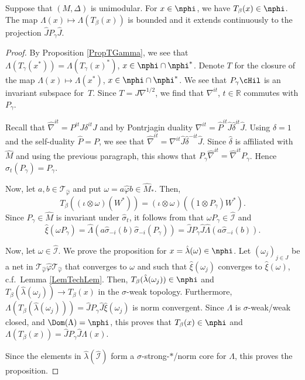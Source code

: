\begin{prop}\label{PropTBeta}
Suppose that $(M, \Delta)$ is unimodular. For $x \in \nphi$, we have $T_\beta(x) \in \nphi$. The map $\Lambda(x) \mapsto \Lambda(T_\beta(x))$ is bounded and it extends continuously to the projection $\hat{J} P_\gamma \hat{J}$.
\end{prop}
\begin{proof}
By Proposition \ref{PropTGamma}, we see that $\Lambda(T_\gamma(x^\ast)) = \Lambda(T_\gamma(x)^\ast)$, $x \in \nphi \cap \nphi^\ast$. Denote $T$ for the closure of the map $\Lambda(x) \mapsto \Lambda(x^\ast)$, $x \in \nphi \cap \nphi^\ast$. We see that $P_\gamma \cHil$ is an invariant subspace for~$T$. Since $T = J \nabla^{1/2}$, we f\/ind that $\nabla^{it}$, $t \in \mathbb{R}$ commutes with $P_\gamma$.

Recall \cite[Lemma 8.8, Proposition 8.9]{KusVae} that $\hat{\nabla}^{it} =  P^{it} J \delta^{it} J$ and by Pontrjagin duality  $\nabla^{it} =  \hat{P}^{it} \hat{J} \hat{\delta}^{it} \hat{J}$. Using $\delta = 1$ and the self-duality $\hat{P} = P$, we see that $\hat{\nabla}^{it} =  \nabla^{it} \hat{J} \hat{\delta}^{-it} \hat{J}$. Since $\hat{\delta}$ is af\/f\/iliated with $\hat{M}$ and using the previous paragraph, this shows that $P_\gamma \hat{\nabla}^{it} = \hat{\nabla}^{it} P_\gamma$. Hence $\hat{\sigma}_t (P_\gamma) = P_\gamma$.

Now, let $a, b \in \mathcal{T}_{\hat{\varphi}}$ and put $\omega = a\hat{ \varphi} b \in \hat{M}_\ast$. Then,
\[
T_\beta\left( (\iota \otimes \omega)(W^\ast) \right) = (\iota \otimes \omega)\left( (1 \otimes P_\gamma) W^\ast \right).
\]
Since $P_\gamma \in \hat{M}$ is invariant under $\hat{\sigma}_t$, it follows from \cite[Chapter VIII, Lemma 2.4 (ii) and Lemma 2.5]{TakII} that $\omega P_\gamma \in \hat{\mathcal{I}}$ and
\[
\hat{\xi}(\omega P_\gamma ) = \hat{\Lambda}(a \hat{\sigma}_{-i}(b) \hat{\sigma}_{-i}(P_\gamma))  = \hat{J} P_\gamma \hat{J} \hat{\Lambda}(a \hat{\sigma}_{-i}(b) ).
\]

Now, let $\omega \in \hat{\mathcal{I}}$. We prove the proposition for $x = \hat{\lambda}(\omega) \in \nphi$. Let $(\omega_j)_{j \in J}$ be a net in $\mathcal{T}_{\hat{\varphi}} \hat{\varphi} \mathcal{T}_{\hat{\varphi}}$ that converges to $\omega$ and such that $\hat{\xi}(\omega_j)$ converges to $\hat{\xi}(\omega)$, c.f.\ Lemma \ref{LemTechLem}. Then, $T_\beta(\hat{\lambda}(\omega_j)) \in \nphi$ and  $T_\beta(\hat{\lambda}(\omega_j)) \rightarrow T_\beta(x)$ in the $\sigma$-weak topology. Furthermore, $\Lambda(T_\beta(\hat{\lambda}(\omega_j))) = \hat{J} P_\gamma \hat{J}\hat{\xi}(\omega_j)$ is norm convergent. Since $\Lambda$ is $\sigma$-weak/weak closed, and $\Dom(\Lambda) = \nphi$, this proves that $T_\beta(x) \in \nphi$ and $\Lambda(T_\beta(x)) =   \hat{J} P_\gamma \hat{J} \Lambda(x)$.

 Since the elements in $\hat{\lambda}(\hat{\mathcal{I}})$ form a $\sigma$-strong-$\ast$/norm core for $\Lambda$, this proves the proposition.
\end{proof}

